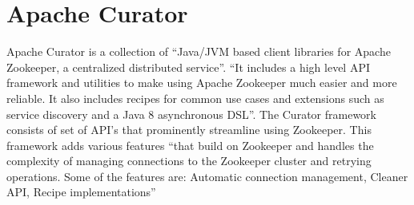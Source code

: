 \section{Apache Curator}

Apache Curator is a collection of ``Java/JVM based client libraries for
Apache Zookeeper, a centralized distributed
service''\cite{hid-sp18-514-apachecurator}.  ``It includes a high level
API framework and utilities to make using Apache Zookeeper much easier
and more reliable.  It also includes recipes for common use cases and
extensions such as service discovery and a Java 8 asynchronous
DSL''\cite{hid-sp18-514-apachecurator}.  The Curator framework consists
of set of API's that prominently streamline using Zookeeper.  This
framework adds various features ``that build on Zookeeper and handles
the complexity of managing connections to the Zookeeper cluster and
retrying operations.  Some of the features are: Automatic connection
management, Cleaner API, Recipe
implementations''\cite{hid-sp18-514-apachecuratorfeatures}
